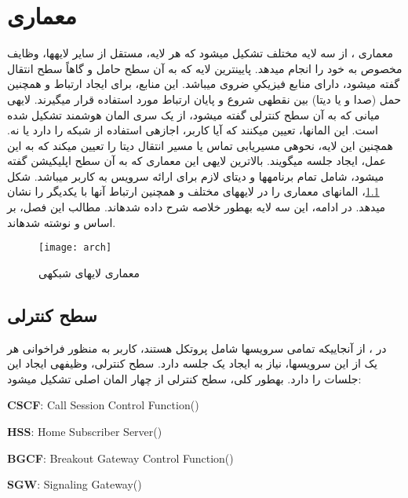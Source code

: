 \chapter{معماری }
\label{archPart}
معماری ، از سه لایه مختلف تشکیل می\nf شود که هر لایه، مستقل از سایر لایه\nf ها، وظایف مخصوص به خود را انجام می\nf دهد. پایین\nf ترین لایه که به آن سطح حامل و گاهاً سطح انتقال گفته می\nf شود، دارای منابع فیزیکیِ ضروی می\nf باشد. این منابع، برای ایجاد ارتباط و همچنین حمل (صدا و یا دیتا) بین نقطه\nf ی شروع و پایان ارتباط مورد استفاده قرار می\nf گیرند. لایه\nf ی میانی که به آن سطح کنترلی گفته می\nf شود، از یک سری المان هوشمند تشکیل شده است. این المان\nf ها، تعیین می\nf کنند که آیا کاربر، اجازه\nf ی استفاده از شبکه را دارد یا نه. همچنین این لایه، نحوه\nf ی مسیریابی تماس یا مسیر انتقال دیتا را تعیین می\nf کند که به این عمل، ایجاد جلسه می\nf گویند. بالاترین لایه\nf ی این معماری که به آن سطح اپلیکیشن گفته می\nf شود، شامل تمام برنامه\nf ها و دیتای لازم برای ارائه سرویس به کاربر می\nf باشد. شکل \ref{arch}، المان\nf های معماری  را در لایه\nf های مختلف و همچنین ارتباط آن\nf ها با یکدیگر را نشان می\nf دهد. در ادامه، این سه لایه به\nf طور خلاصه شرح داده شده\nf اند. مطالب این فصل، بر اساس \cite{blended} و \cite{3gims} نوشته شده\nf اند.

\begin{figure}[h]
\centering
\texttt{[image: arch]}
\caption{معماری لایه\nf ای شبکه\nf ی }
\label{arch}
\end{figure} 

\section{سطح کنترلی}
در ، از آنجایی\nf که تمامی  سرویس\nf ها شامل پروتکل  هستند، کاربر به منظور فراخوانی هر یک از این سرویس\nf ها، نیاز به ایجاد یک جلسه دارد. سطح کنترلی، وظیفه\nf ی ایجاد این جلسات را دارد. به\nf طور کلی، سطح کنترلی از چهار المان اصلی تشکیل می\nf شود:
\begin{enumerate}
\begin{latin}
\item \textbf{CSCF}: Call Session Control Function()
\item \textbf{HSS}: Home Subscriber Server()
\item \textbf{BGCF}: Breakout Gateway Control Function() 
\item \textbf{SGW}: Signaling Gateway()
\end{latin}
\end{enumerate}

